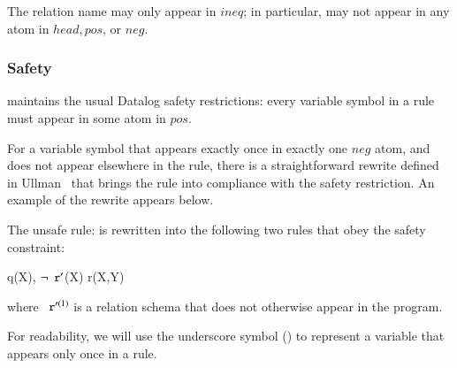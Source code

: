 The relation name \dedalus{<} may only appear in $ineq$; in particular, \dedalus{<} may not appear in any atom in $head, pos$, or $neg$.


\subsubsection{Safety}
\lang maintains the usual Datalog safety restrictions: every variable symbol
 in a rule must appear in some atom in $pos$.

For a variable symbol  that appears exactly once in exactly one $neg$ atom, and does not appear elsewhere in the rule, there is a straightforward rewrite defined in Ullman~\cite{ullmanbook} that brings the rule into compliance with the safety restriction.  An example of the rewrite appears below.

\begin{example}
The unsafe rule: 
is rewritten into the following two rules that obey the safety constraint:

\begin{Drules}
      {q(X), $\lnot\dedalus{r}^\prime$(X)}
      {r(X,Y)}
\end{Drules}

where $\dedalus{r}^{\prime(1)}$ is a relation schema that does not otherwise appear in the program.
\end{example}

For readability, we will use the underscore symbol (\dedalus{_}) to represent a variable that appears only once in a rule.


